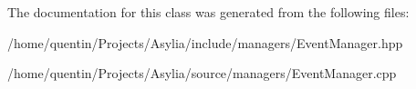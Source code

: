 The documentation for this class was generated from the following files\-:\begin{DoxyCompactItemize}
\item 
/home/quentin/\-Projects/\-Asylia/include/managers/Event\-Manager.\-hpp\item 
/home/quentin/\-Projects/\-Asylia/source/managers/Event\-Manager.\-cpp\end{DoxyCompactItemize}
